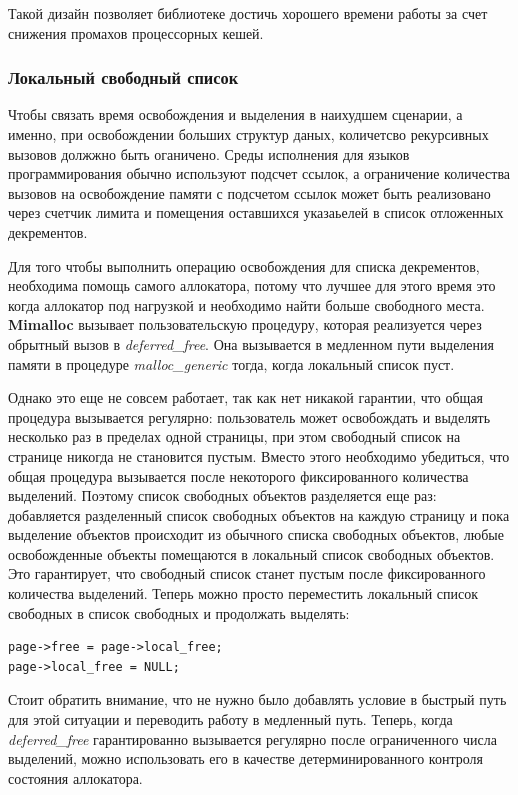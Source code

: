 Такой дизайн позволяет библиотеке достичь хорошего времени работы за счет снижения промахов процессорных кешей.

\subsubsection{Локальный свободный список}

Чтобы связать время освобождения и выделения в наихудшем сценарии, а именно, при освобождении больших структур даных, количетсво рекурсивных вызовов должжно быть оганичено. Среды исполнения для языков программирования обычно используют подсчет ссылок, а ограничение количества вызовов на освобождение памяти с подсчетом ссылок может быть реализовано через счетчик лимита и помещения оставшихся указаьелей в список отложенных декрементов.

Для того чтобы выполнить операцию освобождения для списка декрементов, необходима помощь самого аллокатора, потому что лучшее для этого время это когда аллокатор под нагрузкой и необходимо найти больше свободного места. \textbf{Mimalloc} вызывает пользовательскую процедуру, которая реализуется через обрытный вызов в \textit{deferred\_free}. Она вызывается в медленном пути выделения памяти в процедуре \textit{malloc\_generic} тогда, когда локальный список пуст.

Однако это еще не совсем работает, так как нет никакой гарантии, что общая процедура вызывается регулярно: пользователь может освобождать и выделять несколько раз в пределах одной страницы, при этом свободный список на странице никогда не становится пустым. Вместо этого необходимо убедиться, что общая процедура вызывается после некоторого фиксированного количества выделений. Поэтому список свободных объектов разделяется еще раз: добавляется разделенный список свободных объектов на каждую страницу и пока выделение объектов происходит из обычного списка свободных объектов, любые освобожденные объекты помещаются в локальный список свободных объектов. Это гарантирует, что свободный список станет пустым после фиксированного количества выделений. Теперь можно просто переместить локальный список свободных в список свободных и продолжать выделять:

\begin{lstlisting}
page->free = page->local_free;
page->local_free = NULL;
\end{lstlisting}

Стоит обратить внимание, что не нужно было добавлять условие в быстрый путь для этой ситуации и переводить работу в медленный путь. Теперь, когда \textit{deferred\_free} гарантированно вызывается регулярно после ограниченного числа выделений, можно использовать его в качестве детерминированного контроля состояния аллокатора.

